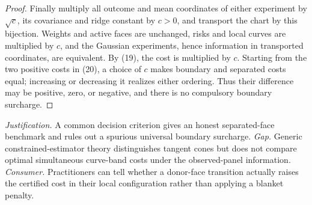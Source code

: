 \documentclass{article}
\begin{document}
\begin{proof}
Finally multiply all outcome and mean coordinates of either experiment by \(\sqrt c\), its covariance and ridge constant by \(c>0\), and transport the chart by this bijection.  Weights and active faces are unchanged, risks and local curves are multiplied by \(c\), and the Gaussian experiments, hence information in transported coordinates, are equivalent.  By (19), the cost is multiplied by \(c\).  Starting from the two positive costs in (20), a choice of \(c\) makes boundary and separated costs equal; increasing or decreasing it realizes either ordering.  Thus their difference may be positive, zero, or negative, and there is no compulsory boundary surcharge.
\end{proof}
\par\smallskip\noindent \textit{Justification.} A common decision criterion gives an honest separated-face benchmark and rules out a spurious universal boundary surcharge. \textit{Gap.} Generic constrained-estimator theory distinguishes tangent cones but does not compare optimal simultaneous curve-band costs under the observed-panel information. \textit{Consumer.} Practitioners can tell whether a donor-face transition actually raises the certified cost in their local configuration rather than applying a blanket penalty.
\end{document}
